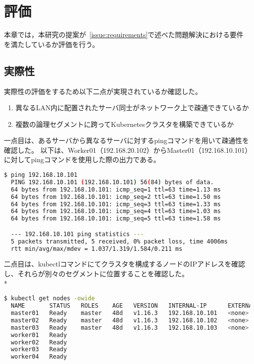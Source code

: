 \chapter{評価}
\label{evaluation}

本章では，本研究の提案が~\ref{issue:requirements}で述べた問題解決における要件を満たしているか評価を行う。

\section{実際性}
\label{evaluation:method}

実際性の評価をするため以下二点が実現されているか確認した。

\begin{enumerate}
  \item 異なるLAN内に配置されたサーバ同士がネットワーク上で疎通できているか
  \item 複数の論理セグメントに跨ってKubernetesクラスタを構築できているか
\end{enumerate}

一点目は、あるサーバから異なるサーバに対するpingコマンドを用いて疎通性を確認した。
以下は、Worker01（192.168.20.102）からMaster01（192.168.10.101）に対してpingコマンドを使用した際の出力である。

\begin{lstlisting}[language=bash]
  $ ping 192.168.10.101
  PING 192.168.10.101 (192.168.10.101) 56(84) bytes of data.
  64 bytes from 192.168.10.101: icmp_seq=1 ttl=63 time=1.13 ms
  64 bytes from 192.168.10.101: icmp_seq=2 ttl=63 time=1.50 ms
  64 bytes from 192.168.10.101: icmp_seq=3 ttl=63 time=1.33 ms
  64 bytes from 192.168.10.101: icmp_seq=4 ttl=63 time=1.03 ms
  64 bytes from 192.168.10.101: icmp_seq=5 ttl=63 time=1.58 ms

  --- 192.168.10.101 ping statistics ---
  5 packets transmitted, 5 received, 0% packet loss, time 4006ms
  rtt min/avg/max/mdev = 1.037/1.319/1.584/0.211 ms
\end{lstlisting}

二点目は、kubectlコマンドにてクラスタを構成するノードのIPアドレスを確認し、それらが別々のセグメントに位置することを確認した。\\*

\begin{lstlisting}[language=bash]
  $ kubectl get nodes -owide
  NAME       STATUS   ROLES    AGE   VERSION   INTERNAL-IP      EXTERNAL-IP   OS-IMAGE             KERNEL-VERSION      CONTAINER-RUNTIME
  master01   Ready    master   48d   v1.16.3   192.168.10.101   <none>        Ubuntu 18.04.3 LTS   4.15.0-70-generic   docker://18.9.7
  master02   Ready    master   48d   v1.16.3   192.168.10.102   <none>        Ubuntu 18.04.3 LTS   4.15.0-70-generic   docker://18.9.7
  master03   Ready    master   48d   v1.16.3   192.168.10.103   <none>        Ubuntu 18.04.3 LTS   4.15.0-70-generic   docker://18.9.7
  worker01   Ready
  worker02   Ready
  worker03   Ready
  worker04   Ready
\end{lstlisting}

